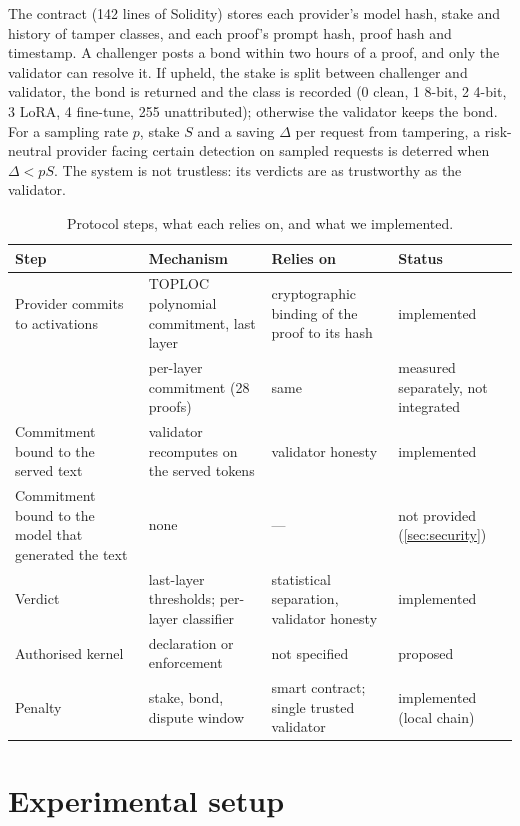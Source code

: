 \documentclass[10pt,twocolumn]{article}
\begin{document}
The contract (142 lines of Solidity) stores each provider's model hash, stake and history of tamper classes, and each proof's prompt hash, proof hash and timestamp.
A challenger posts a bond within two hours of a proof, and only the validator can resolve it.
If upheld, the stake is split between challenger and validator, the bond is returned and the class is recorded (0 clean, 1 8-bit, 2 4-bit, 3 LoRA, 4 fine-tune, 255 unattributed); otherwise the validator keeps the bond.
For a sampling rate $p$, stake $S$ and a saving $\Delta$ per request from tampering, a risk-neutral provider facing certain detection on sampled requests is deterred when $\Delta < pS$.
The system is not trustless: its verdicts are as trustworthy as the validator.

\begin{table}[!t]
\centering
\small
\caption{Protocol steps, what each relies on, and what we implemented.}
\label{tab:protocol}
\begin{tabular}{@{}>{\raggedright\arraybackslash}p{}>{\raggedright\arraybackslash}p{}>{\raggedright\arraybackslash}p{}>{\raggedright\arraybackslash}p{}@{}}
\toprule
Step & Mechanism & Relies on & Status \\
\midrule
Provider commits to activations & TOPLOC polynomial commitment, last layer & cryptographic binding of the proof to its hash & implemented \\
 & per-layer commitment (28 proofs) & same & measured separately, not integrated \\
Commitment bound to the served text & validator recomputes on the served tokens & validator honesty & implemented \\
Commitment bound to the model that generated the text & none & --- & not provided (\cref{sec:security}) \\
Verdict & last-layer thresholds; per-layer classifier & statistical separation, validator honesty & implemented \\
Authorised kernel & declaration or enforcement & not specified & proposed \\
Penalty & stake, bond, dispute window & smart contract; single trusted validator & implemented (local chain) \\
\bottomrule
\end{tabular}
\end{table}

\section{Experimental setup}
\label{sec:setup}
\end{document}

